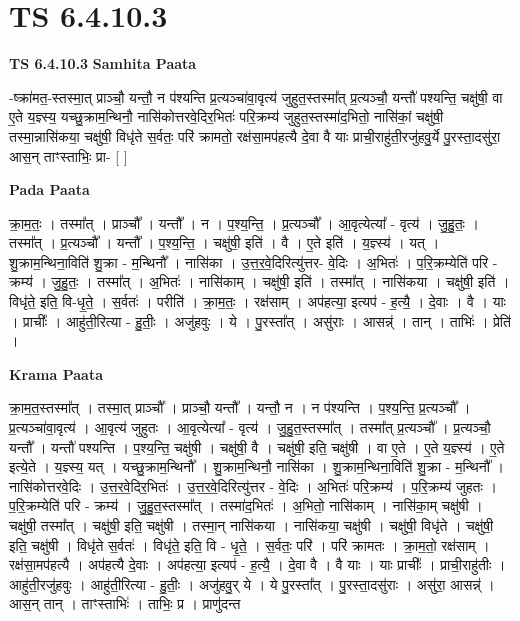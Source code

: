 \documentclass[17pt]{extarticle}
\begin{document}
\section{ TS 6.4.10.3 }

\textbf{TS 6.4.10.3 } \newline
\textbf{Samhita Paata} \newline

-ष्क्रा॑मत॒-स्तस्मा॒त् प्राञ्चौ॒ यन्तौ॒ न प॑श्यन्ति प्र॒त्यञ्चा॑वा॒वृत्य॑ जुहुत॒स्तस्मा᳚त् प्र॒त्यञ्चौ॒ यन्तौ॑ पश्यन्ति॒ चक्षु॑षी॒ वा ए॒ते य॒ज्ञ्स्य॒ यच्छु॒क्राम॒न्थिनौ॒ नासि॑कोत्तरवे॒दिर॒भितः॑ परि॒क्रम्य॑ जुहुत॒स्तस्मा॑द॒भितो॒ नासि॑कां॒ चक्षु॑षी॒ तस्मा॒न्नासि॑कया॒ चक्षु॑षी॒ विधृ॑ते स॒र्वतः॒ परि॑ क्रामतो॒ रक्ष॑सा॒मप॑हत्यै दे॒वा वै याः प्राची॒राहु॑ती॒रजु॑हवु॒र्ये पु॒रस्ता॒दसु॑रा॒ आस॒न् ताꣳस्ताभिः॒ प्रा- [  ] \newline

\textbf{Pada Paata} \newline

क्रा॒म॒तः॒ । तस्मा᳚त् । प्राञ्चौ᳚ । यन्तौ᳚ । न । प॒श्य॒न्ति॒ । प्र॒त्यञ्चौ᳚ । आ॒वृत्येत्या᳚ - वृत्य॑ । जु॒हु॒तः॒ । तस्मा᳚त् । प्र॒त्यञ्चौ᳚ । यन्तौ᳚ । प॒श्य॒न्ति॒ । चक्षु॑षी॒ इति॑ । वै । ए॒ते इति॑ । य॒ज्ञ्स्य॑ । यत् । शु॒क्राम॒न्थिना॒विति॑ शु॒क्रा - म॒न्थिनौ᳚ । नासि॑का । उ॒त्त॒र॒वे॒दिरित्यु॑त्तर- वे॒दिः । अ॒भितः॑ । प॒रि॒क्रम्येति॑ परि - क्रम्य॑ । जु॒हु॒तः॒ । तस्मा᳚त् । अ॒भितः॑ । नासि॑काम् । चक्षु॑षी॒ इति॑ । तस्मा᳚त् । नासि॑कया । चक्षु॑षी॒ इति॑ । विधृ॑ते॒ इति॒ वि-धृ॒ते॒ । स॒र्वतः॑ । परीति॑ । क्रा॒म॒तः॒ । रक्ष॑साम् । अप॑हत्या॒ इत्यप॑ - ह॒त्यै॒ । दे॒वाः । वै । याः । प्राचीः᳚ । आहु॑ती॒रित्या - हु॒तीः॒ । अजु॑हवुः । ये । पु॒रस्ता᳚त् । असु॑राः । आसन्न्॑ । तान् । ताभिः॑ । प्रेति॑ ।  \newline


\textbf{Krama Paata} \newline

क्रा॒म॒त॒स्तस्मा᳚त् । तस्मा॒त् प्राञ्चौ᳚ । प्राञ्चौ॒ यन्तौ᳚ । यन्तौ॒ न । न प॑श्यन्ति । प॒श्य॒न्ति॒ प्र॒त्यञ्चौ᳚ । प्र॒त्यञ्चा॑वा॒वृत्य॑ । आ॒वृत्य॑ जुहुतः । आ॒वृत्येत्या᳚ - वृत्य॑ । जु॒हु॒त॒स्तस्मा᳚त् । तस्मा᳚त् प्र॒त्यञ्चौ᳚ । प्र॒त्यञ्चौ॒ यन्तौ᳚ । यन्तौ॑ पश्यन्ति । प॒श्य॒न्ति॒ चक्षु॑षी । चक्षु॑षी॒ वै । चक्षु॑षी॒ इति॒ चक्षु॑षी । वा ए॒ते । ए॒ते य॒ज्ञ्स्य॑ । ए॒ते इत्ये॒ते । य॒ज्ञ्स्य॒ यत् । यच्छु॒क्राम॒न्थिनौ᳚ । शु॒क्राम॒न्थिनौ॒ नासि॑का । शु॒क्राम॒न्थिना॒विति॑ शु॒क्रा - म॒न्थिनौ᳚ । नासि॑कोत्तरवे॒दिः । उ॒त्त॒र॒वे॒दिर॒भितः॑ । उ॒त्त॒र॒वे॒दिरित्यु॑त्तर - वे॒दिः । अ॒भितः॑ परि॒क्रम्य॑ । प॒रि॒क्रम्य॑ जुहतः । प॒रि॒क्रम्येति॑ परि - क्रम्य॑ । जु॒हु॒त॒स्तस्मा᳚त् । तस्मा॑द॒भितः॑ । अ॒भितो॒ नासि॑काम् । नासि॑का॒म् चक्षु॑षी । चक्षु॑षी॒ तस्मा᳚त् । चक्षु॑षी॒ इति॒ चक्षु॑षी । तस्मा॒न् नासि॑कया । नासि॑कया॒ चक्षु॑षी । चक्षु॑षी॒ विधृ॑ते । चक्षु॑षी॒ इति॒ चक्षु॑षी । विधृ॑ते स॒र्वतः॑ । विधृ॑ते॒ इति॒ वि - धृ॒ते॒ । स॒र्वतः॒ परि॑ । परि॑ क्रामतः । क्रा॒म॒तो॒ रक्ष॑साम् । रक्ष॑सा॒मप॑हत्यै । अप॑हत्यै दे॒वाः । अप॑हत्या॒ इत्यप॑ - ह॒त्यै॒ । दे॒वा वै । वै याः । याः प्राचीः᳚ । प्राची॒राहु॑तीः । आहु॑ती॒रजु॑हवुः । आहु॑ती॒रित्या - हु॒तीः॒ । अजु॑हवु॒र् ये । ये पु॒रस्ता᳚त् । पु॒रस्ता॒दसु॑राः । असु॑रा॒ आसन्न्॑ । आस॒न् तान् । ताꣳस्ताभिः॑ । ताभिः॒ प्र । प्राणु॑दन्त \newline
\end{document}
